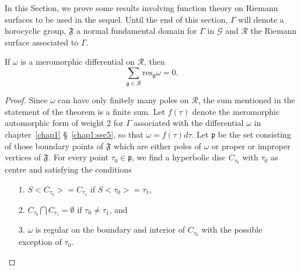 In this Section, we prove some results involving function theory on
Riemann surfaces to be used in the sequel. Until the end of this
section, $\Gamma$ will denote a horocyclic group, $\mathfrak{F}$ a
normal fundamental domain for $\Gamma$ in $\mathscr{G}$ and
$\mathscr{R}$ the Riemann surface associated to $\Gamma$.

\begin{thm}\label{chap2:thm10}
If $\omega$ is a meromorphic differential on $\mathscr{R}$, then 
$$
\sum_{\mathfrak{g}\in \mathscr{R}} \text{res}_{\mathfrak{g}} \omega=0.
$$
\end{thm}

\begin{proof}
Since $\omega$ can have only finitely many poles on $\mathscr{R}$, the
sum mentioned in the statement of the theorem is a finite sum. Let
$f(\tau)$ denote the meromorphic automorphic form of weight 2 for
$\Gamma$ associated with the differential $\omega$ in chapter~\ref{chap1} 
\S~\ref{chap1:sec5},
so that $\omega=f(\tau)d\tau$. Let $\mathfrak{p}$ be the set
consisting of those boundary points of $\mathfrak{F}$ which are either
poles of $\omega$ or proper or improper vertices of
$\mathfrak{F}$. For every point $\tau_0 \in \mathfrak{p}$, we
find a hyperbolic disc $C_{\tau_0}$ with $\tau_0$ as centre and
satisfying the conditions 
\begin{itemize}
\item[1.] $S<C_{\tau_0}>=C_{\tau_1}$ if $S<\tau_0>=\tau_1$,

\item[2.] $C_{\tau_0} \bigcap C_{\tau_1}=\emptyset$ if $\tau_0 \neq
  \tau_1$, and 

\item[3.] $\omega$ is regular on the boundary and interior of
  $C_{\tau_0}$ with the possible exception of $\tau_0$.
\end{itemize}
\end{proof}

